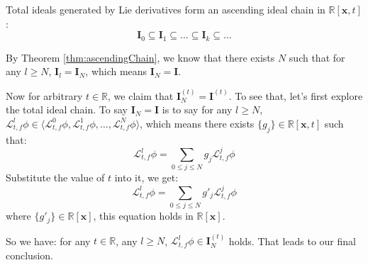 \documentclass{article}
\begin{document}
\begin{Proof}
Total ideals generated by Lie derivatives form an ascending ideal chain in $\mathbb{R}[\boldsymbol{x}, t]$:
\begin{equation*}
	\boldsymbol{I}_0 \subseteq \boldsymbol{I}_1 \subseteq \dots \subseteq \boldsymbol{I}_{k} \subseteq \dots
\end{equation*}

By Theorem \ref{thm:ascendingChain}, we know that there exists $N$ such that for any $l \geq N$, $\boldsymbol{I}_l = \boldsymbol{I}_N$, which means $\boldsymbol{I}_N = \boldsymbol{I}$.

Now for arbitrary $t \in \mathbb{R}$, we claim that $\boldsymbol{I}_N^{(t)} = \boldsymbol{I}^{(t)}$. To see that, let's first explore the total ideal chain. To say $\boldsymbol{I}_N = \boldsymbol{I}$ is to say for any $l \geq N$, $\mathcal{L}_{t, f}^l \phi  \in \langle \mathcal{L}_{t, f}^0 \phi, \mathcal{L}_{t, f}^1 \phi, \dots, \mathcal{L}_{t, f}^N \phi \rangle$, which means there exists $\{ g_j \} \in \mathbb{R} [\boldsymbol{x}, t]$ such that:
	\begin{equation*}
		\mathcal{L}_{t, f}^l \phi = \sum_{0 \leq j \leq N} g_j \mathcal{L}_{t, f}^j \phi
	\end{equation*}
Substitute the value of $t$ into it, we get:
	\begin{equation*}
		\mathcal{L}_{t, f}^l \phi = \sum_{0 \leq j \leq N} g'_j \mathcal{L}_{t, f}^j \phi
	\end{equation*}
where $\{ g'_j \} \in \mathbb{R} [\boldsymbol{x}]$, this equation holds in $\mathbb{R} [\boldsymbol{x}]$. 

So we have: for any $t \in \mathbb{R}$, any $l \geq N$, $\mathcal{L}_{t, f}^l \phi  \in \boldsymbol{I}_N^{(t)}$ holds. That leads to our final conclusion.
\end{Proof}
\end{document}

